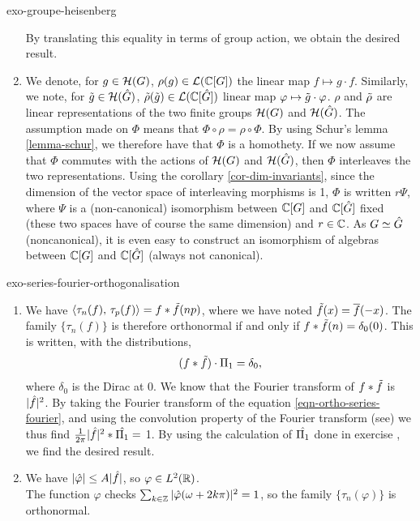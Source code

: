 \begin{correction}{exo-groupe-heisenberg}
\begin{enumerate}
By translating this equality in terms of group action, we obtain the desired result.
\item We denote, for $ g \in \mathcal{H} (G) $, $ \rho (g) \in \mathcal{L} (\mathbb{C} [G]) $ the linear map $ f \mapsto g \cdot f $. Similarly, we note, for $ \tilde{g} \in \mathcal{H} (\hat{G}) $, $ \tilde{\rho} (\tilde{g}) \in \mathcal{L} (\mathbb{C} [\hat{G}]) $ linear map $ \varphi \mapsto \tilde{g} \cdot \varphi $. $ \rho $ and $ \tilde{\rho} $ are linear representations of the two finite groups $ \mathcal{H} (G) $ and $ \mathcal{H} (\hat{G}) $. The assumption made on $ \Phi $ means that $ \Phi \circ \rho = \rho \circ \Phi $. By using Schur's lemma \ref{lemma-schur}, we therefore have that $ \Phi $ is a homothety. If we now assume that $ \Phi $ commutes with the actions of $ \mathcal{H} (G) $ and $ \mathcal{H} (\hat{G}) $, then $ \Phi $ interleaves the two representations. Using the corollary \ref{cor-dim-invariants}, since the dimension of the vector space of interleaving morphisms is 1, $ \Phi $ is written $ r \Psi $, where $ \Psi $ is a (non-canonical) isomorphism between $ \mathbb{C} [G] $ and $ \mathbb{C} [\hat{G}] $ fixed (these two spaces have of course the same dimension) and $ r \in \mathbb{C} $. As $ G \simeq \hat{G} $ (noncanonical), it is even easy to construct an isomorphism of algebras between $ \mathbb{C} [G] $ and $ \mathbb{C} [\hat{G}] $ (always not canonical).
\end{enumerate}
\end{correction}
 
 
\begin{correction}{exo-series-fourier-orthogonalisation}
\begin{enumerate}
\item We have $ \langle \tau_n (f),\,\tau_p (f)\rangle = f * \tilde{f} (np) $, where we have noted $ \tilde{f} (x) = \overline{f} (- x) $. The family $ \{\tau_n (f)\} $ is therefore orthonormal if and only if $ f * \tilde{f} (n) = \delta_0 (0) $. This is written, with the distributions,
\begin{equation}
\label{eqn-ortho-series-fourier}
(f * \tilde{f}) \cdot \Pi_1 = \delta_0,
\end{equation}
where $ \delta_0 $ is the Dirac at 0. We know that the Fourier transform of $ f * \tilde{f} $ is $ | \hat{f} |^2 $. By taking the Fourier transform of the equation \eqref{eqn-ortho-series-fourier}, and using the convolution property of the Fourier transform (see{\upshape \cite{rudin}}) we thus find $ \frac{1}{2 \pi} | \hat{f} |^2*\hat{\Pi_1} = $ 1. By using the calculation of $ \hat{\Pi_1} $ done in exercise , we find the desired result.
\item We have $ | \hat{\varphi} | \leq A | \hat{f} | $, so $ \varphi \in L^2 (\mathbb{R}) $. \\The function $ \varphi $ checks $ \sum_{k \in \mathbb{Z}}{| \hat{\varphi} (\omega + 2k \pi) |^2} = 1 $, so the family $ \{\tau_n (\varphi)\} $ is orthonormal.
\end{enumerate}
\end{correction}
 
